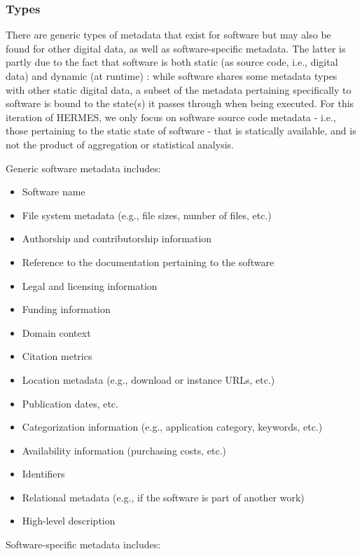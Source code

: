 \documentclass{article}
\begin{document}
\subsubsection{Types}\label{subsubsec:metadata-types}
There are generic types of metadata that exist for software but may also be found for other digital data, as well as software-specific metadata. The latter is partly due to the fact that software is both static (as source code, i.e., digital data) and dynamic (at runtime) \cite{138880/U87URNI5}: while software shares some metadata types with other static digital data, a subset of the metadata pertaining specifically to software is bound to the state(s) it passes through when being executed. For this iteration of HERMES, we only focus on software source code metadata - i.e., those pertaining to the static state of software - that is statically available, and is not the product of aggregation or statistical analysis.

Generic software metadata includes:

\begin{itemize}  
  \item Software name
  \item File system metadata (e.g., file sizes, number of files, etc.)
  \item Authorship and contributorship information
  \item Reference to the documentation pertaining to the software
  \item Legal and licensing information
  \item Funding information
  \item Domain context
  \item Citation metrics
  \item Location metadata (e.g., download or instance URLs, etc.)
  \item Publication dates, etc.
  \item Categorization information (e.g., application category, keywords, etc.)
  \item Availability information (purchasing costs, etc.)
  \item Identifiers
  \item Relational metadata (e.g., if the software is part of another work)
  \item High-level description
\end{itemize}

Software-specific metadata includes:
\end{document}
